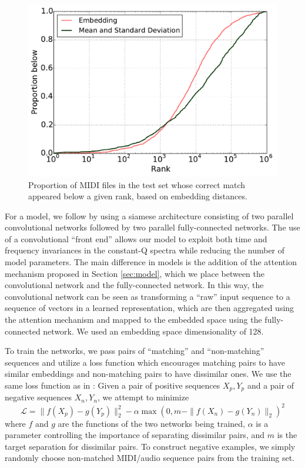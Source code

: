 \documentclass{article}
\begin{document}
\begin{figure}[t]
  \centering
  \includegraphics[width=\columnwidth]{ranks.pdf}
  \caption{Proportion of MIDI files in the test set whose correct match appeared below a given rank, based on embedding distances.}
  \label{fig:ranks}
\end{figure}

For a model, we follow \cite{raffel2015large} by using a siamese architecture consisting of two parallel convolutional networks followed by two parallel fully-connected networks.
The use of a convolutional ``front end'' allows our model to exploit both time and frequency invariances in the constant-Q spectra while reducing the number of model parameters.
The main difference in models is the addition of the attention mechanism proposed in Section \ref{sec:model}, which we place between the convolutional network and the fully-connected network.
In this way, the convolutional network can be seen as transforming a ``raw'' input sequence to a sequence of vectors in a learned representation, which are then aggregated using the attention mechanism and mapped to the embedded space using the fully-connected network.
We used an embedding space dimensionality of 128.

To train the networks, we pass pairs of ``matching'' and ``non-matching'' sequences and utilize a loss function which encourages matching pairs to have similar embeddings and non-matching pairs to have dissimilar ones.
We use the same loss function as in \cite{raffel2015large}: Given a pair of positive sequences $X_p, Y_p$ and a pair of negative sequences $X_n, Y_n$, we attempt to minimize
$$
\mathcal{L} = \|f(X_p) - g(Y_p)\|_2^2 - \alpha \max(0, m - \|f(X_n) - g(Y_n)\|_2)^2
$$
where $f$ and $g$ are the functions of the two networks being trained, $\alpha$ is a parameter controlling the importance of separating dissimilar pairs, and $m$ is the target separation for dissimilar pairs.
To construct negative examples, we simply randomly choose non-matched MIDI/audio sequence pairs from the training set.
\end{document}
